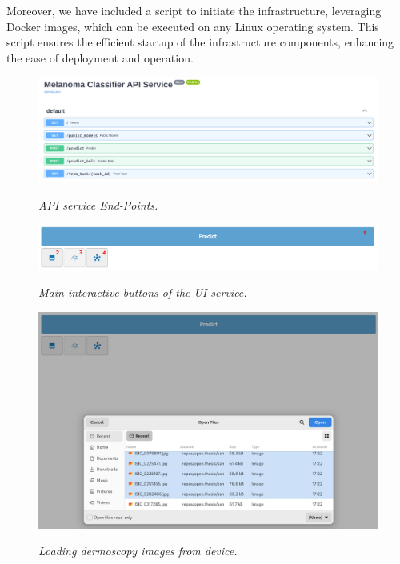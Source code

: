 Moreover, we have included a script to initiate the infrastructure, leveraging
Docker images, which can be executed on any Linux operating system. This script
ensures the efficient startup of the infrastructure components, enhancing the
ease of deployment and operation.

\begin{figure}[H]
  \centering
  \begin{adjustbox}{width=\textwidth, trim={0.2cm 0cm 0.1cm 0cm}, clip}
    \includegraphics[width=\textwidth]{imatges/results/api-endpoints.png}
  \end{adjustbox}
  \caption[API service End-Points]{\textit{API service End-Points. }}
  {\label{fig:api-endpoints}}
\end{figure}

\begin{figure}[H]
  \centering
  \includegraphics[width=\textwidth]{imatges/results/ui-tools.png}
  \caption[Main interactive Buttons of the UI service]{\textit{Main interactive buttons of the UI service. }}
  {\label{fig:ui-tools}}
\end{figure}

\begin{figure}[H]
  \centering
  \begin{adjustbox}{width=\textwidth, trim={0.05cm 1.25cm 0cm 0.1cm}, clip}
    \includegraphics[width=\textwidth]{imatges/results/selecting-images.png}
  \end{adjustbox}
  \caption[Loading dermoscopy images from device]{\textit{Loading dermoscopy images from device. }}
  {\label{fig:selecting-imgs}}
\end{figure}

